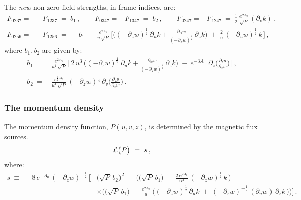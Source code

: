 \documentclass[11pt]{article}
\numberwithin{equation}{section}
\begin{document}
The {\it new} non-zero  field strengths,  in frame indices, are:
%
\begin{equation}
\begin{aligned}
F_{0237} =&  -F_{1237} ~=~  b_1 \,, \qquad   F_{0347}=  -F_{1347} ~=~  b_2 \,, \qquad  F_{0247} =  -F_{1247} ~=~ \frac{1}{2}\,  \frac{e^{2 A_0}}{\sqrt{P}}\,   (\partial_v k) \,,   \\ F_{0256} = & -F_{1256} ~=~  -b_1~+~    \frac{e^{2 A_0}}{u\, \sqrt{P}}\,   \bigg[ \bigg( (-\partial_z w )^{\frac{1}{2}}\,  \partial_u k+ \frac{\partial_u w}{(-\partial_z w )^{\frac{1}{2}}}\,  \partial_z k\bigg)  ~+~  \frac{2}{u}\,(-\partial_z w )^{\frac{1}{2}}\,k \,  \bigg] \,,
\end{aligned}
 \label{fluxfunctions2}
\end{equation}
%
where $b_1, b_2$ are given by:
%
\begin{equation}
\begin{aligned}
 b_1 ~=~ & \frac{ e^{ {2A_0}}}{u^4\,  \sqrt{P}} \,   \bigg[\,2\,  u^3 \,   \bigg( (-\partial_z w )^{\frac{1}{2}}\,  \partial_u k+ \frac{\partial_u w}{(-\partial_z w )^{\frac{1}{2}}}\,  \partial_z k\bigg) ~-~ e^{-3 A_0}\,  \,\partial_z \bigg( \frac{\partial_z p}{\partial_z w}\bigg) \,\bigg]   \,, \\
 b_2  ~=~ &  \frac{ e^{ {\frac{1}{2} A_0}}}{u^4\,  \sqrt{P}} \, (-\partial_z w)^{\frac{1}{4}} \,\partial_v \bigg( \frac{\partial_z p}{\partial_z w}\bigg)\,.
 \end{aligned}
 \label{bres1}
\end{equation}
%



\subsubsection{The momentum density}
\label{ss:momdens}

 The momentum density function, $P(u,v,z)$, is determined by the magnetic flux  sources.
%
\begin{equation}
{\cal L} \big(P\big)  ~=~  s  \,,
 \label{Peqn}
\end{equation}
%
where:
%
\begin{equation}
\begin{aligned}
s  ~\equiv~ - 8\,e^{- A_0}\,(-\partial_z w )^{-\frac{1}{2}} \,\bigg[&  \big(\sqrt{P} \, b_2\big)^2 
~+~  \bigg(\big(\sqrt{P} \, b_1\big) ~-~ \frac{2\, e^{2 A_0}}{u^2}\,(-\partial_z w )^{\frac{1}{2}}\,k\, \bigg)  \\ &  \times \bigg(\big(\sqrt{P} \, b_1\big) ~-~ \frac{e^{2 A_0}}{u} \,\Big((-\partial_z w )^{\frac{1}{2}}\,\partial_u k~+~ (-\partial_z w )^{-\frac{1}{2}}\,(\partial_u w)\,\partial_z k\,\Big) \bigg)\bigg]\,. 
\end{aligned}
 \label{source1}
\end{equation}
%
\end{document}
